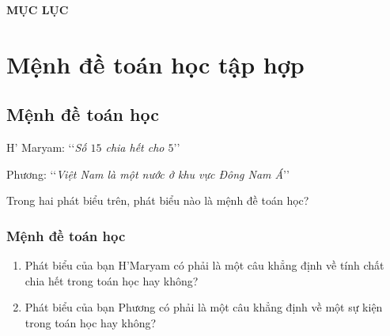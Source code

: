 \documentclass[Main.tex]{subfiles}
\begin{document}
	\setcounter{tocdepth}{1}
	\setcounter{secnumdepth}{3}
	\begin{center}
		\begin{tcolorbox}[enhanced,hbox,
			left=8mm,right=8mm,boxrule=0.55pt,
			bottom=3pt,
			colback=cyan!5,colframe=darkmidnightblue,
			drop lifted shadow=black!50!darkmidnightblue,arc is angular,
			before=\par\vspace*{-1mm},after=\par\bigskip]
			{\Large\bfseries\sffamily\color{darkmidnightblue} MỤC LỤC}
		\end{tcolorbox}
	\end{center}
	
	\vspace*{-0.5cm}
	\makeatletter
	\makeatother
	
	\def\muctieu{Trong chương này, chúng ta tìm hiểu những nội dung sau: mệnh đề toán học, tập hợp và các phép toán trên tập hợp.}
	\chapter{Mệnh đề toán học tập hợp}
	
	\section{Mệnh đề toán học}
	
	\noindent
	H' Maryam: \lq\lq\textit{Số $15$ chia hết cho $5$}\rq\rq
	
	\noindent
	Phương: \lq\lq\textit{Việt Nam là một nước ở khu vực Đông Nam Á}\rq\rq
	
	\begin{cauhoikd}
		Trong hai phát biểu trên, phát biểu nào là mệnh đề toán học?
	\end{cauhoikd}
	
	\subsection{Mệnh đề toán học}
	
	\newcommand{\nhanmanh}[2][darkmidnightblue]{{\large\color{#1}\textit{#2}}}
	
	\begin{hd}
		\begin{enumerate}
			\item Phát biểu của bạn H'Maryam có phải là một câu khẳng định về tính chất chia hết trong toán học hay không?
			\item Phát biểu của bạn Phương có phải là một câu khẳng định về một sự kiện trong toán học hay không?
		\end{enumerate}
	\end{hd}
	
\end{document}
